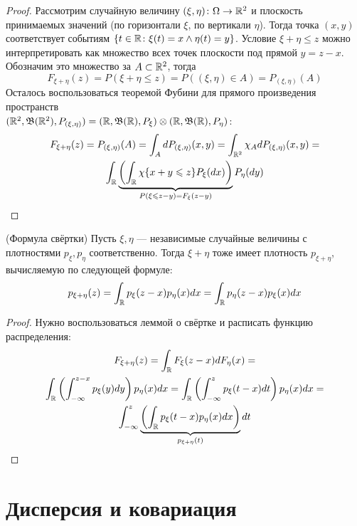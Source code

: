 \begin{proof}
	Рассмотрим случайную величину $(\xi, \eta) \colon \Omega \to \mathbb{R}^2$ и плоскость принимаемых значений (по горизонтали $\xi$, по вертикали $\eta$). Тогда точка $(x, y)$ соответствует событиям $\{t \in \mathbb{R} \colon \xi(t) = x \wedge \eta(t) = y\}$. Условие $\xi + \eta \le z$ можно интерпретировать как множество всех точек плоскости под прямой $y = z - x$. Обозначим это множество за $A \subset \mathbb{R}^2$, тогда
	\[
		F_{\xi + \eta}(z) = P(\xi + \eta \le z) = P((\xi, \eta) \in A) = P_{(\xi, \eta)}(A)
	\]
	Осталось воспользоваться теоремой Фубини для прямого произведения пространств \\ $(\mathbb{R}^2, \mathfrak{B}(\mathbb{R}^2), P_{(\xi, \eta)}) = (\mathbb{R}, \mathfrak{B}(\mathbb{R}), P_\xi) \otimes (\mathbb{R}, \mathfrak{B}(\mathbb{R}), P_\eta)$:
	\begin{multline*}
		F_{\xi + \eta}(z) = P_{(\xi, \eta)}(A) = \int_A dP_{(\xi, \eta)}(x, y) = \int_{\mathbb{R}^2} \chi_A dP_{(\xi, \eta)}(x, y) =
		\\
		\int_{\mathbb{R}} \underbrace{\left(\int_{\mathbb{R}} \chi\{x + y \leqslant z\} P_\xi(dx)\right)}_{P(\xi \leqslant z - y) = F_\xi(z - y)} P_\eta(dy)
	\end{multline*}
\end{proof}

\begin{corollary} (Формула свёртки)
	Пусть $\xi, \eta$ --- независимые случайные величины с плотностями $p_\xi, p_\eta$ соответственно. Тогда $\xi + \eta$ тоже имеет плотность $p_{\xi + \eta}$, вычисляемую по следующей формуле:
	\[
		p_{\xi + \eta}(z) = \int_{\mathbb{R}} p_\xi(z - x)p_\eta(x)dx = \int_{\mathbb{R}} p_\eta(z - x)p_\xi(x)dx
	\]
\end{corollary}

\begin{proof}
	Нужно воспользоваться леммой о свёртке и расписать функцию распределения:
	\begin{multline*}
		F_{\xi + \eta}(z) = \int_{\mathbb{R}} F_\xi(z - x)dF_\eta(x) =
		\\
		\int_{\mathbb{R}} \left(\int_{-\infty}^{z - x} p_\xi(y)dy\right) p_\eta(x)dx = \int_{\mathbb{R}} \left(\int_{-\infty}^z p_\xi(t - x)dt\right)p_\eta(x)dx =
		\\
		\int_{-\infty}^z \underbrace{\left(\int_{\mathbb{R}} p_\xi(t - x)p_\eta(x)dx\right)}_{p_{\xi + \eta}(t)}dt
	\end{multline*}
\end{proof}

\section{Дисперсия и ковариация}


